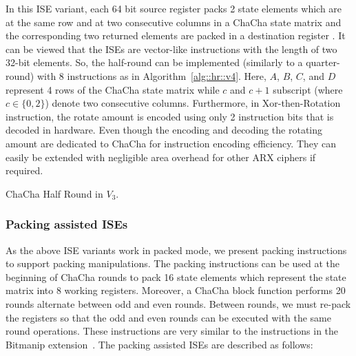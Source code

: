 In this ISE variant, each 64 bit source register packs 2 state elements which are at the same row and at two consecutive columns in a ChaCha state matrix and the corresponding two returned elements are packed in a destination register . It can be viewed that the ISEs are vector-like instructions with the length of two 32-bit elements. So, the half-round can be implemented (similarly to a quarter-round) with 8 instructions as in Algorithm~\ref{alg::hr::v4}. Here, $A$, $B$, $C$, and $D$ represent 4 rows of the ChaCha state matrix while $c$ and $c+1$ subscript (where $c \in\{0,2\}$) denote two consecutive columns.
Furthermore, in Xor-then-Rotation instruction, the rotate amount  is encoded using only 2 instruction bits that is decoded in hardware.
Even though the encoding and decoding the rotating amount are dedicated to ChaCha for instruction encoding efficiency. They can easily be extended with negligible area overhead for other ARX ciphers if required.

\begin{algorithm}
\BlankLine
{}
\caption{ChaCha Half Round in $V_3$.}
\label{alg::hr::v4}
\end{algorithm}

\subsubsection{Packing assisted ISEs}
As the above ISE variants work in packed mode, we present packing instructions to support packing manipulations.
The packing instructions can be used at the beginning of ChaCha rounds to pack 16 state elements which represent the state matrix into 8 working registers. 
Moreover, a ChaCha block function performs 20 rounds alternate between odd and even rounds. Between rounds, we must re-pack the registers so that the odd and even rounds can be executed with the same round operations. These instructions are very similar to the  instructions in the Bitmanip extension~\cite{riscv:bitmanip:draft}. The packing assisted ISEs are described as follows:

